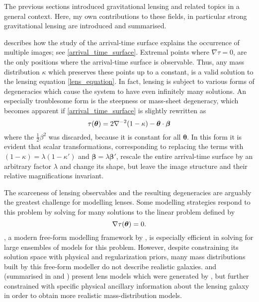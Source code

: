 
The previous sections introduced gravitational lensing and related topics in a
general context.  Here, my own contributions to these fields, in
particular strong gravitational lensing are introduced and summarised.

 describes how the study of the arrival-time surface explains
the occurrence of multiple images; see \eqref{arrival_time_surface}.  Extremal
points where $\nabla\tau = 0$, are the only positions where the arrival-time
surface is observable.  Thus, any mass distribution $\kappa$ which preserves
these points up to a constant, is a valid solution to the lensing equation
\eqref*{lens_equation}.  In fact, lensing is subject to various forms of
degeneracies which cause the system to have even infinitely many solutions.  An
especially troublesome form is the steepness or mass-sheet degeneracy, which
becomes apparent if \eqref{arrival_time_surface} is slightly rewritten as
%
\begin{equation}\eqlbl{tau_degen}%
    \tau(\bm\theta) = 2\nabla^{-2}(1 - \kappa) - \bm\theta\cdot\bm\beta
\end{equation}%
%
where the $\frac{1}{2}\beta^2$ was discarded, because it is constant for all
$\bm\theta$.  In this form it is evident that scalar transformations,
corresponding to replacing the terms with $(1-\kappa) = \lambda(1-\kappa')$ and
$\bm\beta = \lambda\bm\beta'$, rescale the entire arrival-time surface by an
arbitrary factor $\lambda$ and change its shape, but leave the image structure
and their relative magnifications invariant.

The scarceness of lensing observables and the resulting degeneracies are
arguably the greatest challenge for modelling lenses.  Some modelling strategies
respond to this problem by solving for many solutions to the linear problem
defined by
%
\begin{equation}\eqlbl{fermat}%
    \nabla\tau(\bm\theta) = 0.
\end{equation}%
%
, a modern free-form modelling framework by , is
especially efficient in solving for large ensembles of models for this problem.
However, despite constraining its solution space with physical and
regularization priors, many mass distributions built by this free-form modeller
do not describe realistic galaxies.   and 
(summarised in  and ) present lens models
which were generated by , but further constrained with specific
physical ancillary information about the lensing galaxy in order to obtain more
realistic mass-distribution models.  

